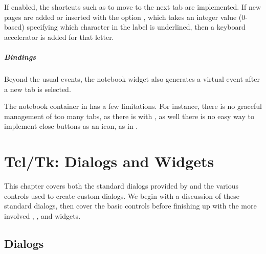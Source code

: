 If enabled, the shortcuts such as  to move to the
next tab are implemented. If new pages are added or inserted with the
option , which takes an integer value
(0-based) specifying which character in the label is underlined, then
a keyboard accelerator is added for that letter.

\paragraph{Bindings}
Beyond the usual events, the notebook widget also generates a
 virtual event after a new tab is
selected.

The notebook container in \TK\/ has a few limitations. For instance,
there is no graceful management of too many tabs, as there is with
\GTK, as well there is no easy way to implement close buttons as an
icon, as in \Qt.


\chapter{Tcl/Tk: Dialogs and Widgets}
\label{sec:tcltk:widgets}

This chapter covers both the standard dialogs provided by \TK\/ and
the various controls used to create custom dialogs. We begin with a
discussion of these standard dialogs, then cover the basic controls
before finishing up with the more involved ,
, and  widgets.




\section{Dialogs}
\label{sec:tcltk:dialogs}
